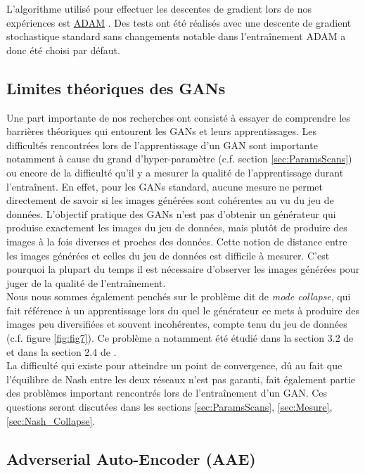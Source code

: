\documentclass[11pt,francais]{article}
\begin{document}
L'algorithme utilisé pour effectuer les descentes de gradient lors de nos expériences est \href{https://arxiv.org/pdf/1412.6980.pdf}{ADAM} \cite{kingma2014adam}. Des tests ont été réalisés avec une descente de gradient stochastique standard sans changements notable dans l'entraînement ADAM a donc été choisi par défaut.\\

\subsection{Limites théoriques des GANs}
\label{sec:CompEtLimites}
Une part importante de nos recherches ont consisté à essayer de comprendre les barrières théoriques qui entourent les GANs et leurs apprentissages. Les difficultés rencontrées lors de l'apprentissage d'un GAN sont importante notamment à cause du grand d'hyper-paramètre (c.f. section \ref{sec:ParamsScans}) ou encore de la difficulté qu'il y a mesurer la qualité de l'apprentissage durant l'entraînent. 
En effet, pour les GANs standard, aucune mesure ne permet directement de savoir si les images générées sont cohérentes au vu du jeu de données. L'objectif pratique des GANs n'est pas d'obtenir un générateur qui produise exactement les images du jeu de données, mais plutôt de produire des images à la fois diverses et proches des données. Cette notion de distance entre les images générées et celles du jeu de données est difficile à mesurer. C'est pourquoi la plupart du temps il est nécessaire d'observer les images générées pour juger de la qualité de l'entraînement.\\
Nous nous sommes également penchés sur le problème dit de \textit{mode collapse}, qui fait référence à un apprentissage lors du quel le générateur ce mets à produire des images peu diversifiées et souvent incohérentes, compte tenu du jeu de données (c.f. figure \ref{fig:fig7}). Ce problème a notamment été  étudié dans la section 3.2 de \cite{salimans2016improved} et dans la section 2.4 de \cite{DBLP:journals/corr/MetzPPS16}.\\
La difficulté qui existe pour atteindre un point de convergence, dû au fait que l'équilibre de Nash entre les deux réseaux n'est pas garanti, fait également partie des problèmes important rencontrés lors de l'entraînement d'un GAN.
Ces questions seront discutées dans les sections  \ref{sec:ParamsScans}, \ref{sec:Mesure}, \ref{sec:Nash_Collapse}.

\newpage
\subsection{Adverserial Auto-Encoder (AAE)}
\label{sec:AAE}
\end{document}
